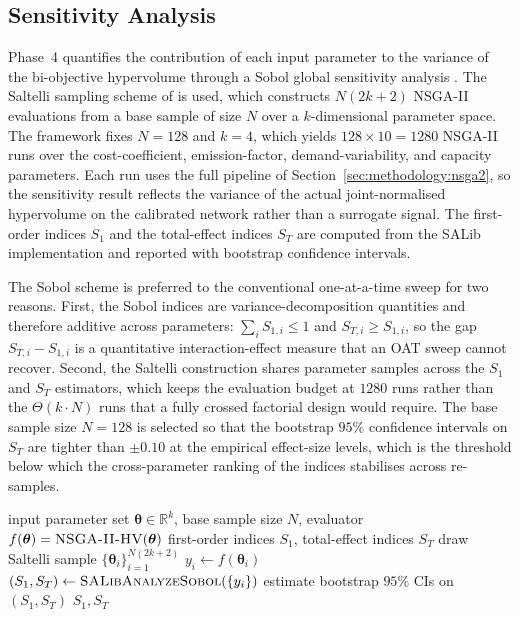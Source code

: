 \documentclass[review,preprint,authoryear,12pt]{elsarticle}
\begin{document}
\subsection{Sensitivity Analysis}
\label{sec:methodology:sensitivity}

Phase~4 quantifies the contribution of each input parameter to the
variance of the bi-objective hypervolume through a Sobol global
sensitivity analysis \citep{sobol1993sensitivity}. The Saltelli
sampling scheme of \citet{saltelli2010variance} is used, which
constructs $N(2k+2)$ NSGA-II evaluations from a base sample of size
$N$ over a $k$-dimensional parameter space. The framework fixes
$N = 128$ and $k = 4$, which yields $128 \times 10 = 1280$ NSGA-II
runs over the cost-coefficient, emission-factor, demand-variability,
and capacity parameters. Each run uses the full pipeline of
Section~\ref{sec:methodology:nsga2}, so the sensitivity result
reflects the variance of the actual joint-normalised hypervolume on
the calibrated network rather than a surrogate signal. The first-order
indices $S_1$ and the total-effect indices $S_T$ are computed from
the SALib implementation \citep{herman2017salib} and reported with
bootstrap confidence intervals.

The Sobol scheme is preferred to the conventional one-at-a-time sweep
for two reasons. First, the Sobol indices are variance-decomposition
quantities and therefore additive across parameters:
$\sum_i S_{1,i} \leq 1$ and $S_{T,i} \geq S_{1,i}$, so the gap
$S_{T,i} - S_{1,i}$ is a quantitative interaction-effect measure that
an OAT sweep cannot recover. Second, the Saltelli construction shares
parameter samples across the $S_1$ and $S_T$ estimators, which keeps
the evaluation budget at $1280$ runs rather than the $\Theta(k \cdot N)$
runs that a fully crossed factorial design would require. The base
sample size $N = 128$ is selected so that the bootstrap $95\%$
confidence intervals on $S_T$ are tighter than $\pm 0.10$ at the
empirical effect-size levels, which is the threshold below which the
cross-parameter ranking of the indices stabilises across re-samples.

\begin{algorithm}[H]
\caption{Sobol global sensitivity analysis (Saltelli scheme)}
\label{alg:sobol}
\begin{algorithmic}[1]
\Require input parameter set $\boldsymbol{\theta} \in \mathbb{R}^k$, base sample size $N$, evaluator $f(\boldsymbol{\theta}) = \textsc{NSGA-II-HV}(\boldsymbol{\theta})$
\Ensure first-order indices $S_1$, total-effect indices $S_T$
\State draw Saltelli sample $\{\boldsymbol{\theta}_i\}_{i=1}^{N(2k+2)}$ 
  \State $y_i \gets f(\boldsymbol{\theta}_i)$ 
\EndFor
\State $(S_1, S_T) \gets \textsc{SALibAnalyzeSobol}(\{y_i\})$
\State estimate bootstrap $95\%$ CIs on $(S_1, S_T)$
\State \Return $S_1, S_T$
\end{algorithmic}
\end{algorithm}
\end{document}
